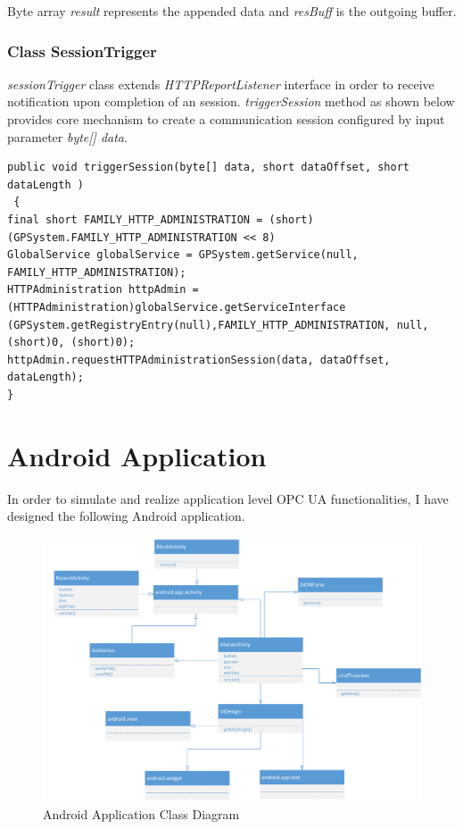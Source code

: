 Byte array \emph{result} represents the appended data and \emph{resBuff} is the outgoing buffer. 

\subsubsection{Class SessionTrigger}
\emph{sessionTrigger} class extends \emph{HTTPReportListener} interface in order to receive notification upon completion of an session.
\emph{triggerSession} method as shown below provides core mechanism to create a communication session configured by input parameter \emph{byte[] data}.
\begin{Verbatim}[fontsize=\relsize{-2}, frame=lines,framesep=4mm, label=\fbox{\small\emph{Trigger Session}}]
public void triggerSession(byte[] data, short dataOffset, short dataLength )
 {
final short FAMILY_HTTP_ADMINISTRATION = (short) (GPSystem.FAMILY_HTTP_ADMINISTRATION << 8)
GlobalService globalService = GPSystem.getService(null, FAMILY_HTTP_ADMINISTRATION);
HTTPAdministration httpAdmin = (HTTPAdministration)globalService.getServiceInterface
(GPSystem.getRegistryEntry(null),FAMILY_HTTP_ADMINISTRATION, null, (short)0, (short)0);
httpAdmin.requestHTTPAdministrationSession(data, dataOffset, dataLength);
}
\end{Verbatim}

\section{Android Application}
In order to simulate and realize application level  OPC UA functionalities, I have designed the following Android application.


\begin{figure}[!htb]
	\centering
	\includegraphics[width=1\textwidth]{android-class}
		\caption{Android Application Class Diagram}
	\label{fig:android-class}
\end{figure}

